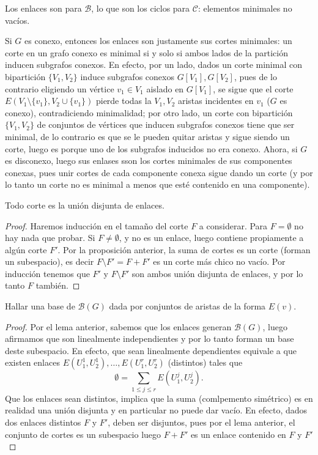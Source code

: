 \documentclass[../main.tex]{subfiles}
\begin{document}
\begin{obs}
Los enlaces son para $\mathcal B$, lo que son los ciclos para $\mathcal C$: elementos minimales no vacíos.

Si $G$ es conexo, entonces los enlaces son justamente sus cortes minimales: un corte en un grafo conexo es minimal si y solo si ambos lados de la partición inducen subgrafos conexos. En efecto, por un lado, dados un corte minimal con bipartición $\{V_1,V_2\}$ induce subgrafos conexos $G[V_1],G[V_2]$, pues de lo contrario eligiendo un vértice $v_1 \in V_1$ aislado en $G[V_1]$, se sigue que el corte $E(V_1 \setminus \{v_1 \}, V_2 \cup \{ v_1 \})$ pierde todas la $V_1,V_2$ aristas incidentes en $v_1$ ($G$ es conexo), contradiciendo minimalidad; por otro lado, un corte con bipartición $\{V_1,V_2\}$ de conjuntos de vértices que inducen subgrafos conexos tiene que ser minimal, de lo contrario es que se le pueden quitar aristas y sigue siendo un corte, luego es porque uno de los subgrafos inducidos no era conexo. Ahora, si $G$ es disconexo, luego sus enlases sson los cortes minimales de sus componentes conexas, pues unir cortes de cada componente conexa sigue dando un corte (y por lo tanto un corte no es minimal a menos que esté contenido en una componente).
\end{obs}

\begin{lemma}
Todo corte es la unión disjunta de enlaces.
\end{lemma}
\begin{proof}
Haremos inducción en el tamaño del corte $F$ a considerar. Para $F = \emptyset$ no hay nada que probar. Si $F \neq \emptyset$, y no es un enlace, luego contiene propiamente a algún corte $F'$. Por la proposición anterior, la suma de cortes es un corte (forman un subespacio), es decir $F \setminus F' = F + F'$ es un corte más chico no vacío. Por inducción tenemos que $F'$ y $F \setminus F'$ son ambos unión disjunta de enlaces, y por lo tanto $F$ también.
\end{proof}

\begin{exercise}
Hallar una base de $\mathcal{B}(G)$ dada por conjuntos de aristas de la forma $E(v)$.
\end{exercise}
\begin{proof}
Por el lema anterior, sabemos que los enlaces generan $\mathcal{B} (G)$, luego afirmamos que son linealmente independientes y por lo tanto forman un base deste subespacio. En efecto, que sean linealmente dependientes equivale a que existen enlaces $E(U_1^1,U_2^1), \ldots, E(U_1^r, U_2^r)$ (distintos) tales que
$$
\emptyset = \sum_{1 \leq j\leq r} E(U_1^j,U_2^j).
$$
Que los enlaces sean distintos, implica que la suma (comlpemento simétrico) es en realidad una unión disjunta y en particular no puede dar vacío. En efecto, dados dos enlaces distintos $F$ y $F'$, deben ser disjuntos, pues por el lema anterior, el conjunto de cortes es un subespacio luego $F+F'$ es un enlace contenido en $F$ y $F'$
\end{proof}
\end{document}
